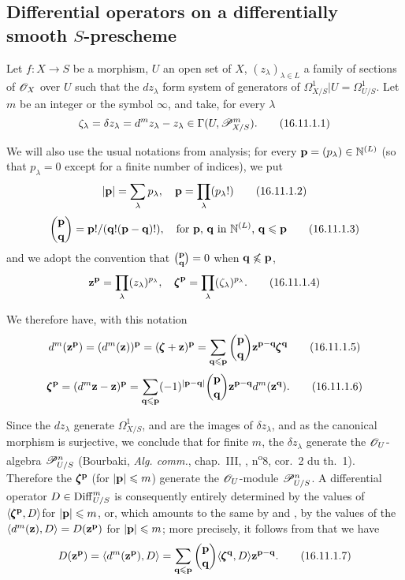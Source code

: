 \subsection{Differential operators on a differentially smooth $S$-prescheme}
\label{IV.16.11}

\begin{env}[16.11.1]
\label{IV.16.11.1}
Let $f:X \to S$ be a morphism, $U$ an open set of $X$, $(z_\lambda)_{\lambda \in L}$ a family of sections of $\mathscr{O}_X$ over $U$ such that the $dz_\lambda$ form system of generators of $\Omega_{X/S}^1|U = \Omega_{U/S}^1$.
Let $m$ be an integer or the symbol $\infty$, and take, for every $\lambda$
\[
  \label{IV.16.11.1.1}
  \zeta_\lambda = \delta z_\lambda = d^m z_\lambda - z_\lambda \in \Gamma(U, \mathscr{P}_{X/S}^m).
  \tag{16.11.1.1}
\]

We will also use the usual notations from analysis;
for every $\mathbf{p} = (p_\lambda) \in \mathbb{N}^{(L)}$ (so that $p_\lambda = 0$ except for a finite number of indices), we put
\[
  \label{IV.16.11.1.2}
  |\mathbf{p}| = \sum_\lambda p_\lambda, \quad \mathbf{p} = \prod_\lambda (p_\lambda!)
  \tag{16.11.1.2}
\]
\[
  \label{IV.16.11.1.3}
  \binom{\mathbf p}{\mathbf q} = \mathbf{p}!/(\mathbf{q}!(\mathbf{p} - \mathbf{q})!), \quad \text{for $\mathbf{p}$, $\mathbf{q}$ in $\mathbb{N}^{(L)}$, $\mathbf{q} \leqslant \mathbf{p}$}
  \tag{16.11.1.3}
\]
and we adopt the convention that $\binom{\mathbf p}{\mathbf q} = 0$ when $\mathbf{q} \not\leqslant \mathbf{p}$,
\[
  \label{IV.16.11.1.4}
  \mathbf{z}^\mathbf{p} = \prod_\lambda (z_\lambda)^{p_\lambda}, \quad {\pmb\zeta}^{\mathbf p} = \prod_\lambda (\zeta_\lambda)^{p_\lambda}.
  \tag{16.11.1.4}
\]

We therefore have, with this notation
\[
  \label{IV.16.11.1.5}
  d^m(\mathbf{z}^{\mathbf p}) = (d^m(\mathbf{z}))^{\mathbf p} = (\pmb{\zeta} + \mathbf{z})^{\mathbf p} = \sum_{\mathbf{q} \leqslant \mathbf{p}} \binom{\mathbf p}{\mathbf q} \mathbf{z}^{\mathbf{p} - \mathbf{q}} \pmb{\zeta}^{\mathbf q}
  \tag{16.11.1.5}
\]
\[
  \label{IV.16.11.1.6}
  \pmb{\zeta}^{\mathbf p} = (d^m \mathbf{z} - \mathbf{z})^{\mathbf p} =  \sum_{\mathbf{q} \leqslant \mathbf{p}} (-1)^{|\mathbf{p} - \mathbf{q}|} \binom{\mathbf p}{\mathbf q} \mathbf{z}^{\mathbf{p} - \mathbf{q}} d^m(\mathbf{z}^{\mathbf q}).
  \tag{16.11.1.6}
\]
  
Since the $dz_\lambda$ generate $\Omega_{X/S}^1$, and are the images of $\delta z_\lambda$, and as the canonical morphism  is surjective, we conclude that for finite $m$, the $\delta z_\lambda$ generate the $\mathscr{O}_U$-algebra $\mathscr{P}_{U/S}^n$ (Bourbaki, \emph{Alg. comm.}, chap.~III, , n\textsuperscript{o}8, cor.\ 2 du th.\ 1).
Therefore the $\pmb{\zeta}^{\mathbf p}$ (for $|\mathbf{p}| \leqslant m$) generate the $\mathscr{O}_U$-module $\mathscr{P}_{U/S}^n$.
A differential operator $D \in \operatorname{Diff}_{U/S}^m$ is consequently entirely determined by the values of $\langle \pmb{\zeta}^{\mathbf p}, D \rangle $for $|\mathbf{p}| \leqslant m$, or, which amounts to the same by  and , by the values
of the $\langle d^m(\mathbf{z}), D \rangle = D(\mathbf{z}^{\mathbf p})$ for $|\mathbf{p}| \leqslant m$;
more precisely, it follows from  that we have
\[
  \label{IV.16.11.1.7}
  D(\mathbf{z}^{\mathbf p}) = \langle d^m({\mathbf z}^{\mathbf p}), D \rangle = \sum_{\mathbf{q} \leqslant \mathbf{p}} \binom{\mathbf p}{\mathbf q} \langle \pmb{\zeta}^{\mathbf q} , D \rangle \mathbf{z}^{\mathbf{p} - \mathbf{q}}.
  \tag{16.11.1.7}
\]
\end{env}

